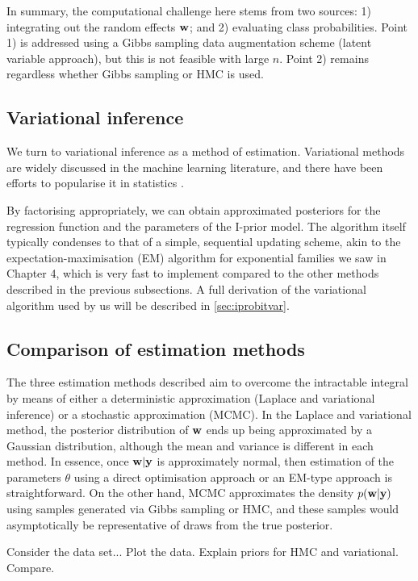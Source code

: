 In summary, the computational challenge here stems from two sources: 1) integrating out the random effects ${\mathbf w}$; and 2) evaluating class probabilities.
Point 1) is addressed using a Gibbs sampling data augmentation scheme (latent variable approach), but this is not feasible with large $n$.
Point 2) remains regardless whether Gibbs sampling or HMC is used.



\subsection{Variational inference}

We turn to variational inference as a method of estimation. Variational methods are widely discussed in the machine learning literature, and there have been efforts to popularise it in statistics \citep{blei2017variational}.

By factorising appropriately, we can obtain approximated posteriors for the regression function and the parameters of the I-prior model.
The algorithm itself typically condenses to that of a simple, sequential updating scheme, akin to the expectation-maximisation (EM) algorithm for exponential families we saw in Chapter 4, which is very fast to implement compared to the other methods described in the previous subsections.
A full derivation of the variational algorithm used by us will be described in \cref{sec:iprobitvar}.

\subsection{Comparison of estimation methods}


The three estimation methods described aim to overcome the intractable integral by means of either a deterministic approximation (Laplace and variational inference) or a stochastic approximation (MCMC).
In the Laplace and variational method, the posterior distribution of ${\mathbf w}$ ends up being approximated by a Gaussian distribution, although the mean and variance is different in each method.
In essence, once ${\mathbf w}|{\mathbf y}$ is approximately normal, then estimation of the parameters $\theta$ using a direct optimisation approach or an EM-type approach is straightforward.
On the other hand, MCMC approximates the density $p({\mathbf w}|{\mathbf y})$ using samples generated via Gibbs sampling or HMC, and these samples would asymptotically be representative of draws from the true posterior.

Consider the data set...
Plot the data. Explain priors for HMC and variational. Compare.



